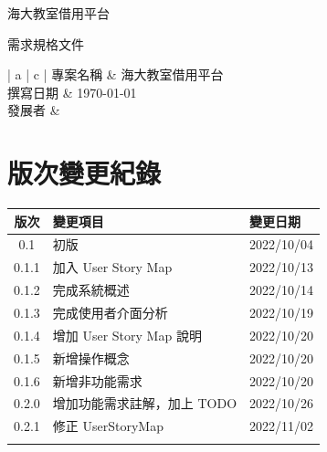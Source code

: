 \documentclass{article}
\begin{document}
\begin{titlepage}
	\centering

	{\huge 海大教室借用平台}

	\vfill

	{\huge 需求規格文件}

	\vfill

	\begin{Large}
		\begin{center}
			\begin{tabular}{| a | c |}
				\hline
				專案名稱 & 海大教室借用平台               \\ \hline
				撰寫日期 & \today                 \\ \hline
				發展者  &  \\ \hline
			\end{tabular}
		\end{center}
	\end{Large}
\end{titlepage}


\section*{版次變更紀錄}

\begin{tabularx}{\textwidth}{| c | X | X |}
	\rowcolor{LightGray}
	\hline
	版次    & 變更項目                 & 變更日期       \\ \hline
	0.1   & 初版                   & 2022/10/04 \\ \hline
	0.1.1 & 加入 User Story Map    & 2022/10/13 \\ \hline
	0.1.2 & 完成系統概述               & 2022/10/14 \\ \hline
	0.1.3 & 完成使用者介面分析            & 2022/10/19 \\ \hline
	0.1.4 & 增加 User Story Map 說明 & 2022/10/20 \\ \hline
	0.1.5 & 新增操作概念               & 2022/10/20 \\ \hline
	0.1.6 & 新增非功能需求              & 2022/10/20 \\ \hline
	0.2.0 & 增加功能需求註解，加上 TODO     & 2022/10/26 \\ \hline
	0.2.1 & 修正 UserStoryMap      & 2022/11/02 \\ \hline
	      &                      &            \\ \hline
\end{tabularx}
\end{document}
